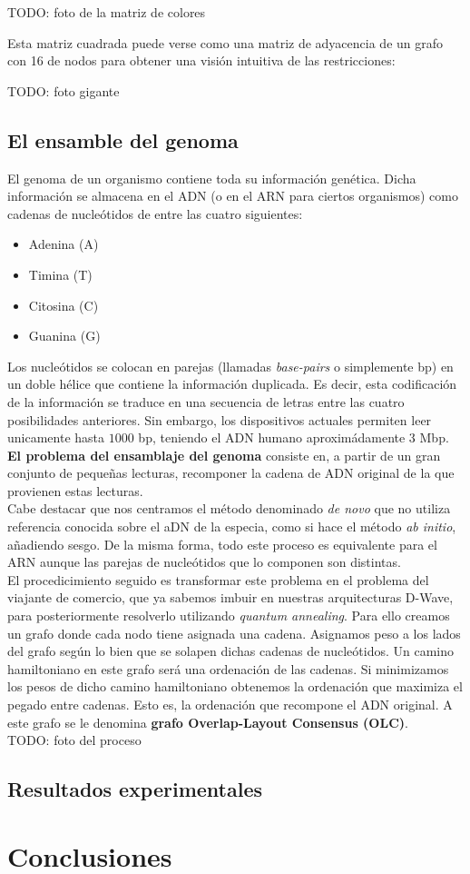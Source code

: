 \documentclass[11pt]{article}
\begin{document}
TODO: foto de la matriz de colores

Esta matriz cuadrada puede verse como una matriz de adyacencia de un grafo con 16 de nodos para obtener una visión intuitiva de las restricciones:

TODO: foto gigante

\subsection{El ensamble del genoma}

El genoma de un organismo contiene toda su información genética. Dicha información se almacena en el ADN (o en el ARN para ciertos organismos) como cadenas de nucleótidos de entre las cuatro siguientes:

\begin{itemize}
	\item Adenina (A)
	\item Timina (T)
	\item Citosina (C) 
	\item Guanina (G)
\end{itemize}

Los nucleótidos se colocan en parejas (llamadas \emph{base-pairs} o simplemente bp) en un doble hélice que contiene la información duplicada. Es decir, esta codificación de la información se traduce en una secuencia de letras entre las cuatro posibilidades anteriores. Sin embargo, los dispositivos actuales permiten leer unicamente hasta $1000$ bp, teniendo el ADN humano aproximádamente 3 Mbp. \\

\textbf{El problema del ensamblaje del genoma} consiste en, a partir de un gran conjunto de pequeñas lecturas, recomponer la cadena de ADN original de la que provienen estas lecturas. \\

Cabe destacar que nos centramos el método denominado \emph{de novo} que no utiliza referencia conocida sobre el aDN de la especia, como si hace el método \emph{ab initio}, añadiendo sesgo. De la misma forma, todo este proceso es equivalente para el ARN aunque las parejas de nucleótidos que lo componen son distintas. \\

El procedicimiento seguido es transformar este problema en el problema del viajante de comercio, que ya sabemos imbuir en nuestras arquitecturas D-Wave, para posteriormente resolverlo utilizando \emph{quantum annealing}. Para ello creamos un grafo donde cada nodo tiene asignada una cadena. Asignamos peso a los lados del grafo según lo bien que se solapen dichas cadenas de nucleótidos. Un camino hamiltoniano en este grafo será una ordenación de las cadenas. Si minimizamos los pesos de dicho camino hamiltoniano obtenemos la ordenación que maximiza el pegado entre cadenas. Esto es, la ordenación que recompone el ADN original. A este grafo se le denomina \textbf{grafo Overlap-Layout Consensus (OLC)}.\\

TODO: foto del proceso

\subsection{Resultados experimentales}

\section{Conclusiones}
\end{document}
